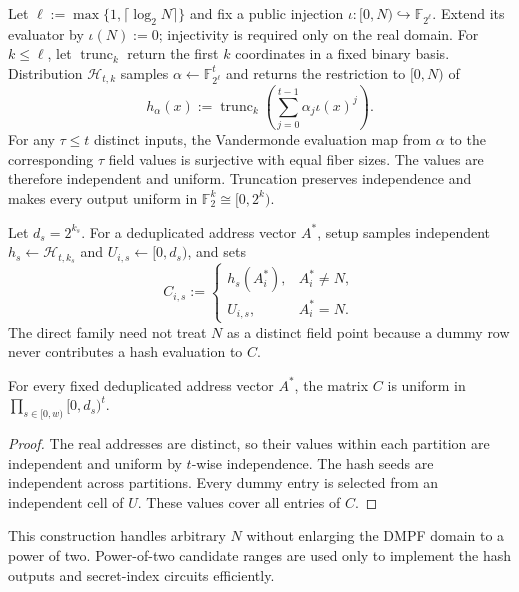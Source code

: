 Let $\ell:=\max\{1,\lceil\log_2N\rceil\}$ and fix a public injection
$\iota:[0,N)\hookrightarrow\mathbb F_{2^\ell}$.  Extend its evaluator by
$\iota(N):=0$; injectivity is required only on the real domain.  For
$k\leq\ell$, let $\operatorname{trunc}_k$ return the first $k$ coordinates in
a fixed binary basis.  Distribution $\mathcal H_{t,k}$ samples
$\alpha\gets\mathbb F_{2^\ell}^t$ and returns the restriction to $[0,N)$ of
\begin{equation}\label{eq:waterfall-direct-hash-family}
 h_\alpha(x):=\operatorname{trunc}_k\!\left(
   \sum_{j=0}^{t-1}\alpha_j\iota(x)^j\right).
\end{equation}
For any $\tau\leq t$ distinct inputs, the Vandermonde evaluation map from
$\alpha$ to the corresponding $\tau$ field values is surjective with equal
fiber sizes.  The values are therefore independent and uniform.  Truncation
preserves independence and makes every output uniform in
$\mathbb F_2^k\cong[0,2^k)$.

Let $d_s=2^{k_s}$.  For a deduplicated address vector $A^*$, setup samples
independent $h_s\gets\mathcal H_{t,k_s}$ and $U_{i,s}\gets[0,d_s)$, and sets
\begin{equation}\label{eq:waterfall-candidate-matrix}
 C_{i,s}:=\begin{cases}
 h_s(A_i^*),&A_i^*\neq N,\\
 U_{i,s},&A_i^*=N.
 \end{cases}
\end{equation}
The direct family need not treat $N$ as a distinct field point because a
dummy row never contributes a hash evaluation to $C$.

\begin{lemma}\label{lem:waterfall-uniform-candidates}
For every fixed deduplicated address vector $A^*$, the matrix $C$ is uniform
in $\prod_{s\in[0,w)}[0,d_s)^t$.
\end{lemma}

\begin{proof}
The real addresses are distinct, so their values within each partition are
independent and uniform by $t$-wise independence.  The hash seeds are
independent across partitions.  Every dummy entry is selected from an
independent cell of $U$.  These values cover all entries of $C$.
\end{proof}

This construction handles arbitrary $N$ without enlarging the DMPF domain to
a power of two.  Power-of-two candidate ranges are used only to implement the
hash outputs and secret-index circuits efficiently.

